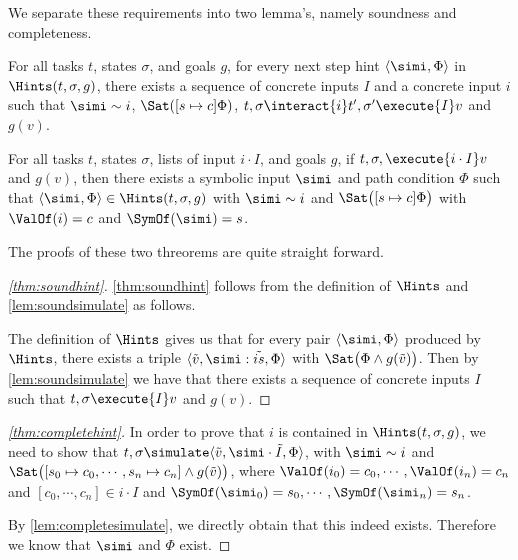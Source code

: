 We separate these requirements into two lemma's, namely soundness and completeness.

\begin{theorem}
  \label{thm:soundhint}
  For all tasks $t$, states $\sigma$, and goals $g$,
  for every next step hint $\<\simi,\Phi\>$ in $\Hints(t,\sigma,g)$,
  there exists a sequence of concrete inputs $I$ and a concrete input $i$ such that $\simi\sim i$,
  $\Sat([s\mapsto c]\Phi)$, $t,\sigma\interact{i} t',\sigma'\execute{I} v$ and $g(v)$.
\end{theorem}

\begin{theorem}
  \label{thm:completehint}
  For all tasks $t$, states $\sigma$, lists of input $i \cdot I$, and goals $g$,
  if $t,\sigma,\execute{i \cdot I} v$ and $g(v)$, then there exists a symbolic input $\simi$ and path condition $\Phi$
  such that $\<\simi,\Phi\> \in \Hints(t,\sigma,g)$ with $\simi\sim i$ and $\Sat\big([s\mapsto c]\Phi\big)$ with $\ValOf(i) = c$ and $\SymOf(\simi) = s$.
\end{theorem}

The proofs of these two threorems are quite straight forward.

\begin{proof}[\cref{thm:soundhint}]
  \cref{thm:soundhint} follows from the definition of $\Hints$ and \cref{lem:soundsimulate} as follows.

  The definition of $\Hints$ gives us that for every pair $\<\simi,\Phi\>$ produced by $\Hints$,
  there exists a triple $\<\tilde{v},\simi:\tilde{is},\Phi\>$ with $\Sat\big(\Phi \land g(\tilde{v})\big)$.
  Then by \cref{lem:soundsimulate} we have that there exists a sequence of concrete inputs $I$ such that
  $t,\sigma\execute{I}v$ and $g(v)$.
\end{proof}


\begin{proof}[\cref{thm:completehint}]
  In order to prove that $i$ is contained in $\Hints(t,\sigma,g)$, we need to show that $t,\sigma \simulate \<\tilde{v},\simi \cdot \tilde{I},\Phi\>$, with $\simi\sim i$ and $\Sat\big([s_0\mapsto c_0,\cdots,s_n\mapsto c_n] \land g(\tilde{v})\big)$, where $\ValOf(i_0)= c_0, \cdots, \ValOf(i_n) = c_n$ and $[c_0,\cdots,c_n]\in i \cdot I$ and $\SymOf(\simi_0) = s_0, \cdots, \SymOf(\simi_n) = s_n$.

  By \cref{lem:completesimulate}, we directly obtain that this indeed exists. Therefore we know that $\simi$ and $\Phi$ exist.
\end{proof}
